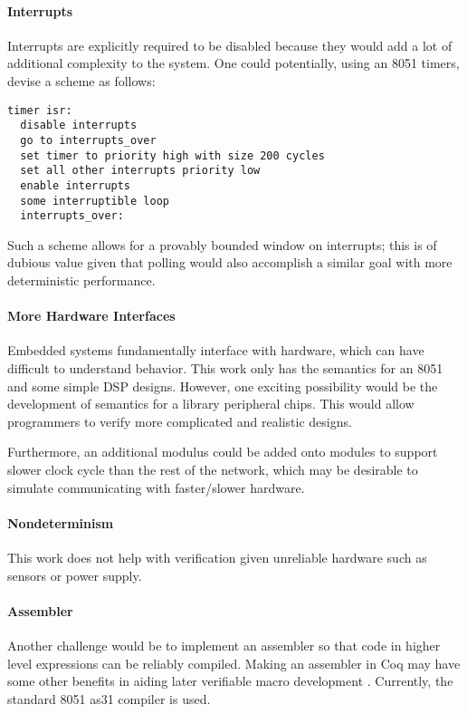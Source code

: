 \documentclass[preprint,12pt]{sigplanconf}
\begin{document}
\paragraph{Interrupts}
Interrupts are explicitly required to be disabled because they would
add a lot of additional complexity to the system. One could potentially,
using an 8051 timers, devise a scheme as follows:
\vfill
\begin{lstlisting}[caption={The timer ISR is used to guaranteed a bound on the amount of time interrupt might be executing.}]
  timer isr:
  disable interrupts
  go to interrupts_over
  set timer to priority high with size 200 cycles
  set all other interrupts priority low
  enable interrupts
  some interruptible loop
  interrupts_over:
\end{lstlisting}
Such a scheme allows for a provably bounded window on interrupts; this
is of dubious value given that polling would also accomplish a similar
goal with more deterministic performance.

\paragraph{More Hardware Interfaces}
Embedded systems fundamentally interface with hardware, which can have
difficult to understand behavior. This work only has the semantics 
for an 8051 and some simple DSP designs. However, one exciting possibility would be the
development of semantics for a library peripheral chips.  This would allow
programmers to verify more complicated and realistic designs.

Furthermore, an additional modulus
could be added  onto modules to support slower clock cycle than the rest of
the network, which may be desirable to simulate communicating with
faster/slower hardware.

\paragraph{Nondeterminism}
This work does not help with verification given unreliable hardware
such as sensors or power supply. 

\paragraph{Assembler}

Another challenge would be to implement an assembler so that code in
higher level expressions can be reliably compiled. Making an assembler in
Coq may have some other benefits in aiding later verifiable macro
development \cite{coqasm}. Currently, the standard 8051 as31 compiler
is used.
\end{document}
